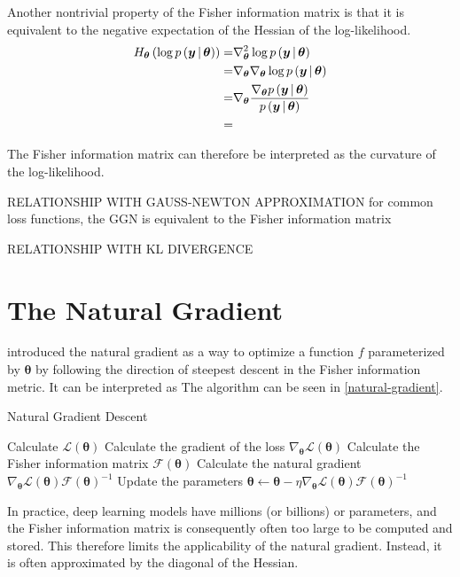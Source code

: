 Another nontrivial property of the Fisher information matrix is that it is equivalent to the negative expectation of the Hessian of the log-likelihood.
%
\begin{align*}
    H_{\bm\theta} \left(\log p\left(\bm y \, | \, \bm \theta\right)\right) = & {} \nabla^2_{\bm\theta} \log p\left(\bm y \, | \, \bm \theta\right)
    \\ =&{} \nabla_{\bm\theta} \nabla_{\bm\theta} \log p\left(\bm y \, | \, \bm \theta\right)
    \\ =&{} \nabla_{\bm\theta} \frac{\nabla_{\bm\theta} p\left(\bm y \, | \, \bm \theta\right)}{p\left(\bm y \, | \, \bm \theta\right)}
    \\ =&{} \frac{}{}
\end{align*}
%
The Fisher information matrix can therefore be interpreted as the curvature of the log-likelihood.

RELATIONSHIP WITH GAUSS-NEWTON APPROXIMATION
for common loss functions, the GGN is equivalent to the Fisher information matrix~\cite{martens2020new}

RELATIONSHIP WITH KL DIVERGENCE

\section{The Natural Gradient}



\cite{amari1998natural} introduced the natural gradient as a way to optimize a function \(f\) parameterized by \(\bm\theta\) by following the direction of steepest descent in the Fisher information metric.
It can be interpreted as
The algorithm can be seen in \cref{natural-gradient}.
%
\begin{algorithm}
    \caption{Natural Gradient Descent} \label{natural-gradient}
    \begin{algorithmic}[1]
        \State Calculate \(\mathcal{L}(\bm\theta)\)
        \State Calculate the gradient of the loss \(\nabla_{\bm\theta} \mathcal{L}(\bm\theta)\)
        \State Calculate the Fisher information matrix \(\mathcal{F}(\bm\theta)\)
        \State Calculate the natural gradient \(\nabla_{\bm\theta} \mathcal{L}(\bm\theta) \mathcal{F}(\bm\theta)^{-1}\)
        \State Update the parameters \(\bm\theta \gets \bm\theta - \eta \nabla_{\bm\theta} \mathcal{L}(\bm\theta) \mathcal{F}(\bm\theta)^{-1}\)
        \EndFor
        \State \Return {\(\bm\theta\)}
    \end{algorithmic}
\end{algorithm}
%
In practice, deep learning models have millions (or billions) or parameters, and the Fisher information matrix is consequently often too large to be computed and stored.
This therefore limits the applicability of the natural gradient.
Instead, it is often approximated by the diagonal of the Hessian.


